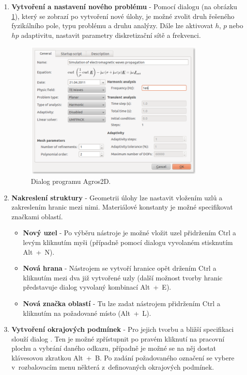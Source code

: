 \begin{enumerate}
\item {\bf Vytvoření a nastavení nového problému} - Pomocí dialogu  (na obrázku \ref{obr:sim_problem_properties}), který se zobrazí po vytvoření nové úlohy, je možné zvolit druh řešeného fyzikálního pole, typu problému a druhu analýzy. Dále lze aktivovat $h$, $p$ nebo $hp$ adaptivitu, nastavit parametry diskretizační sítě a frekvenci.
\begin{figure}[!h]
	\centering
	\includegraphics[width=9cm]{sim_problem_properties.png}
	\caption{Dialog  programu Agros2D.}
	\label{obr:sim_problem_properties}
\end{figure}
\item {\bf Nakreslení struktury} - Geometrii úlohy lze nastavit vložením uzlů a zakreslením hranic mezi nimi. Materiálové konstanty je možné specifikovat značkami oblastí.
\begin{itemize}
\item {\bf Nový uzel} - Po výběru nástroje  je možné vložit uzel přidržením Ctrl a levým kliknutím myši (případně pomocí dialogu vyvolaném stisknutím \mbox{Alt + N}).
\item {\bf Nová hrana} - Nástrojem  se vytvoří hranice opět držením Ctrl a kliknutím mezi dva již vytvořené uzly (další možnost tvorby hranic představuje dialog vyvolaný kombinací \mbox{Alt + E}).
\item {\bf Nová značka oblastí} - Tu lze zadat nástrojem  přidržením Ctrl a kliknutím na požadované místo (\mbox{Alt + L}).
\end{itemize}
\item {\bf Vytvoření okrajových podmínek} - Pro jejich tvorbu a bližší specifikaci slouží dialog . Ten je možné zpřístupnit po pravém kliknutí na pracovní plochu a vybrání daného odkazu, případně je možné se na něj dostat klávesovou zkratkou \mbox{Alt + B}. Po zadání požadovaného označení se vybere v~rozbalovacím menu některá z~definovaných okrajových podmínek.


\end{enumerate}
